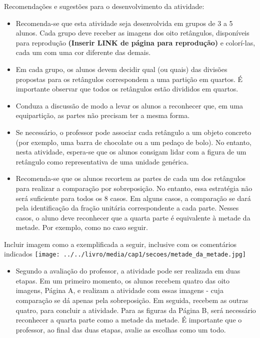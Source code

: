 \documentclass{book}
\begin{document}
  Recomendações e sugestões para o desenvolvimento da atividade:

\begin{itemize} %
    \item       Recomenda-se que esta atividade seja desenvolvida em grupos de 3 a 5 alunos. Cada grupo deve receber as imagens dos oito retângulos, disponíveis para reprodução       {\bf (Inserir LINK de página para reprodução)}       e colorí-las, cada um com uma cor diferente das demais.
    \item       Em cada grupo, os alunos devem decidir qual (ou quais) das divisões propostas para os retângulos correspondem a uma partição em quartos. É importante observar que todos os retângulos estão divididos em quartos.
    \item       Conduza a discussão de modo a levar os alunos a reconhecer que, em uma equipartição, as partes não precisam ter a mesma forma.
    \item       Se necessário, o professor pode associar cada retângulo a um objeto concreto (por exemplo, uma barra de chocolate ou a um pedaço de bolo). No entanto, nesta atividade, espera-se que os alunos consigam lidar com a figura de um retângulo como representativa de uma unidade genérica.
    \item       Recomenda-se que os alunos recortem as partes de cada um dos retângulos para realizar a comparação por sobreposição. No entanto, essa estratégia não será suficiente para todos os 8 casos. Em alguns casos, a comparação se dará pela identificação da fração unitária correspondente a cada parte. Nesses casos, o aluno deve reconhecer que a quarta parte é equivalente à metade da metade. Por exemplo, como no caso seguir.
\end{itemize} %


  \begin{imagem*}[breakable]{}{}     Incluir imagem como a exemplificada a seguir, inclusive com os comentários indicados
        \texttt{[image: ../../livro/media/cap1/secoes/metade\_da\_metade.jpg]}
  \end{imagem*}

\begin{itemize} %
    \item       Segundo a avaliação do professor, a atividade pode ser realizada em duas etapas. Em um primeiro momento, os alunos recebem quatro das oito imagens, Página A, e realizam a atividade com essas imagens - cuja comparação se dá apenas pela sobreposição. Em seguida, recebem as outras quatro, para concluir a atividade. Para as figuras da Página B, será necessário reconhecer a quarta parte como a metade da metade. É importante que o professor, ao final das duas etapas, avalie as escolhas como um todo.
\end{itemize} %
\end{document}
